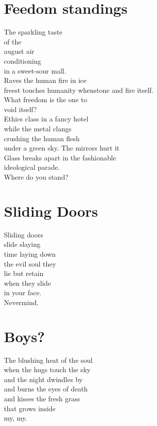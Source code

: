 \documentclass[a4paper,twoside, openany]{book}
\newenvironment{Verse}
  {\center\varwidth{\linewidth}\fontsize{18}{21.6}\selectfont}
  {\endvarwidth\endcenter}
\begin{document}
\chapter{Feedom standings}
\begin{Verse}
The sparkling taste\\
of the\\
august air\\
conditioning\\
in a sweet-sour mall.\\
Raves the human fire in ice\\
 freest touches humanity whenstone and fire itself.\\
What freedom is the one to \\
void itself?\\
Ethics class in a fancy hotel\\
while the metal clangs\\
crushing the human flesh \\
under a green sky.
The mirrors hurt it\\
Glass breaks apart in the fashionable\\
ideological parade.\\
Where do you stand?
\end{Verse}
\chapter{Sliding Doors}
\begin{Verse}
Sliding doors\\
slide slaying\\
time laying down\\
the evil soul they\\
lie but retain\\
when they slide\\
in your face.\\
Nevermind.
\end{Verse}
\chapter{Boys?}
\begin{Verse}
The blushing heat of the soul\\
when the hugs touch the sky\\
and the night dwindles by\\
and burns the eyes of death\\
and kisses the fresh grass\\
that grows inside\\
my, my.
\end{Verse}
\end{document}
